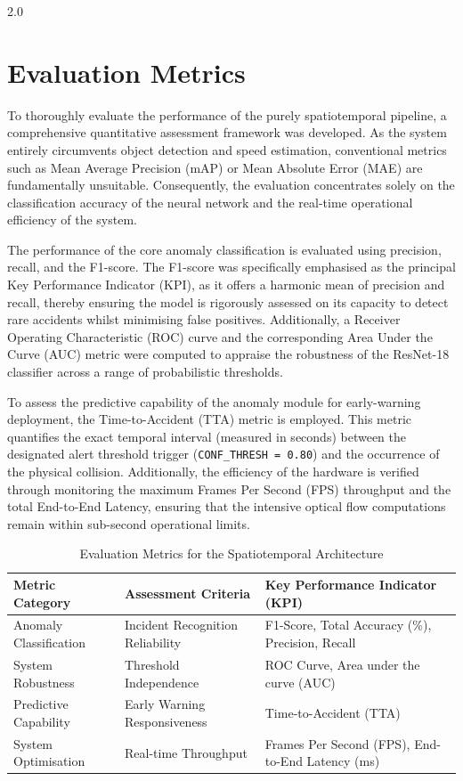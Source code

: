 \begin{spacing}{2.0}
\section{Evaluation Metrics}
To thoroughly evaluate the performance of the purely spatiotemporal pipeline, a comprehensive quantitative assessment framework was developed. As the system entirely circumvents object detection and speed estimation, conventional metrics such as Mean Average Precision (mAP) or Mean Absolute Error (MAE) are fundamentally unsuitable. Consequently, the evaluation concentrates solely on the classification accuracy of the neural network and the real-time operational efficiency of the system.

The performance of the core anomaly classification is evaluated using precision, recall, and the F1-score. The F1-score was specifically emphasised as the principal Key Performance Indicator (KPI), as it offers a harmonic mean of precision and recall, thereby ensuring the model is rigorously assessed on its capacity to detect rare accidents whilst minimising false positives. Additionally, a Receiver Operating Characteristic (ROC) curve and the corresponding Area Under the Curve (AUC) metric were computed to appraise the robustness of the ResNet-18 classifier across a range of probabilistic thresholds.

To assess the predictive capability of the anomaly module for early-warning deployment, the Time-to-Accident (TTA) metric is employed. This metric quantifies the exact temporal interval (measured in seconds) between the designated alert threshold trigger (\texttt{CONF\_THRESH = 0.80}) and the occurrence of the physical collision. Additionally, the efficiency of the hardware is verified through monitoring the maximum Frames Per Second (FPS) throughput and the total End-to-End Latency, ensuring that the intensive optical flow computations remain within sub-second operational limits.

\begin{table}[H]
    \centering
    \begin{tabular}{p{3cm} p{5cm} p{6cm}}
        \toprule
        \textbf{Metric Category} & \textbf{Assessment Criteria} & \textbf{Key Performance Indicator (KPI)} \\
        \midrule
        Anomaly Classification & Incident Recognition Reliability & F1-Score, Total Accuracy (\%), Precision, Recall \\
        System Robustness & Threshold Independence & ROC Curve, Area under the curve (AUC) \\
        Predictive Capability & Early Warning Responsiveness & Time-to-Accident (TTA) \\
        System Optimisation & Real-time Throughput & Frames Per Second (FPS), End-to-End Latency (ms) \\
        \bottomrule
    \end{tabular}
    \caption{Evaluation Metrics for the Spatiotemporal Architecture}
    \label{tab:evaluation_metrics}
\end{table}
\end{spacing}
\newpage
